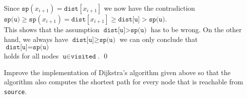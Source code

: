\begin{enumerate}
      Since $\texttt{sp}(x_{i+1}) = \texttt{dist}[x_{i+1}]$ we now have the contradiction
      \\[0.2cm]
      \hspace*{1.3cm} 
      $\texttt{sp(u)} \geq \texttt{sp}(x_{i+1}) = \texttt{dist}[x_{i+1}] \geq \texttt{dist[u]} > \texttt{sp(u)}$.
      \\[0.2cm]
      This shows that the assumption $\texttt{dist[u]} > \texttt{sp(u)}$ has to be wrong.  On the
      other hand, we always have $\texttt{dist[u]} \geq \texttt{sp(u)}$ we can only conclude that
      \\[0.2cm]
      \hspace*{1.3cm}
      $\texttt{dist[u]} = \texttt{sp(u)}$
      \\[0.2cm]
      holds for all nodes $\texttt{u} \in \texttt{visited}$. \qed
\end{enumerate}

\exercise
Improve the implementation of Dijkstra's algorithm given above so that the algorithm also computes
the shortest path for every node that is reachable from \texttt{source}.
\eox
\pagebreak

